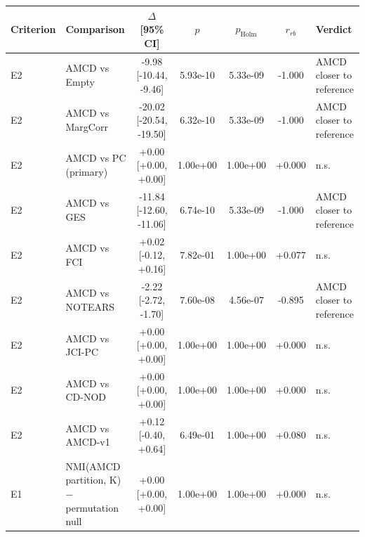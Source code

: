 \begin{tabular}{llccccl}
\toprule
Criterion & Comparison & $\Delta$ [95\% CI] & $p$ & $p_{\mathrm{Holm}}$ & $r_{rb}$ & Verdict \\
\midrule
E2 & AMCD vs Empty & -9.98 [-10.44, -9.46] & 5.93e-10 & 5.33e-09 & -1.000 & AMCD closer to reference \\
E2 & AMCD vs MargCorr & -20.02 [-20.54, -19.50] & 6.32e-10 & 5.33e-09 & -1.000 & AMCD closer to reference \\
E2 & AMCD vs PC (primary) & +0.00 [+0.00, +0.00] & 1.00e+00 & 1.00e+00 & +0.000 & n.s. \\
E2 & AMCD vs GES & -11.84 [-12.60, -11.06] & 6.74e-10 & 5.33e-09 & -1.000 & AMCD closer to reference \\
E2 & AMCD vs FCI & +0.02 [-0.12, +0.16] & 7.82e-01 & 1.00e+00 & +0.077 & n.s. \\
E2 & AMCD vs NOTEARS & -2.22 [-2.72, -1.70] & 7.60e-08 & 4.56e-07 & -0.895 & AMCD closer to reference \\
E2 & AMCD vs JCI-PC & +0.00 [+0.00, +0.00] & 1.00e+00 & 1.00e+00 & +0.000 & n.s. \\
E2 & AMCD vs CD-NOD & +0.00 [+0.00, +0.00] & 1.00e+00 & 1.00e+00 & +0.000 & n.s. \\
E2 & AMCD vs AMCD-v1 & +0.12 [-0.40, +0.64] & 6.49e-01 & 1.00e+00 & +0.080 & n.s. \\
E1 & NMI(AMCD partition, K) − permutation null & +0.00 [+0.00, +0.00] & 1.00e+00 & 1.00e+00 & +0.000 & n.s. \\
\bottomrule
\end{tabular}
